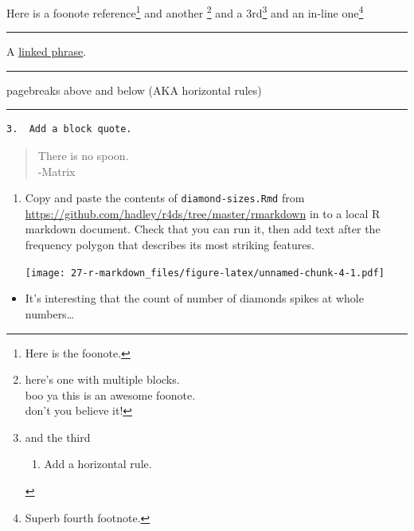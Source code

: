 \documentclass[]{book}
\providecommand{\tightlist}{%
  \setlength{\itemsep}{0pt}\setlength{\parskip}{0pt}}
\let\rmarkdownfootnote\footnote%
\def\footnote{\protect\rmarkdownfootnote}
\theoremstyle{definition}
\theoremstyle{definition}
\theoremstyle{definition}
\theoremstyle{remark}
\begin{document}
Here is a foonote reference\footnote{Here is the foonote.} and another
\footnote{here's one with multiple blocks.\\
  boo ya this is an awesome foonote.\\
  don't you believe it!} and a 3rd\footnote{and the third

  \begin{enumerate}
  \def\labelenumi{\arabic{enumi}.}
  \setcounter{enumi}{1}
  \tightlist
  \item
    Add a horizontal rule.
  \end{enumerate}} and an in-line one\footnote{Superb fourth footnote.}

\begin{center}\rule{0.5\linewidth}{\linethickness}\end{center}

A \href{http://example.com/}{linked phrase}.

\begin{center}\rule{0.5\linewidth}{\linethickness}\end{center}

pagebreaks above and below (AKA horizontal rules)

\begin{center}\rule{0.5\linewidth}{\linethickness}\end{center}

\begin{verbatim}
3.  Add a block quote.
\end{verbatim}

\begin{quote}
There is no spoon.\\
-Matrix
\end{quote}

\begin{enumerate}
\def\labelenumi{\arabic{enumi}.}
\setcounter{enumi}{2}
\item
  Copy and paste the contents of \texttt{diamond-sizes.Rmd} from
  \url{https://github.com/hadley/r4ds/tree/master/rmarkdown} in to a
  local R markdown document. Check that you can run it, then add text
  after the frequency polygon that describes its most striking features.

  \texttt{[image: 27-r-markdown\_files/figure-latex/unnamed-chunk-4-1.pdf]}
\end{enumerate}

\begin{itemize}
\tightlist
\item
  It's interesting that the count of number of diamonds spikes at whole
  numbers\ldots{}
\end{itemize}
\end{document}

